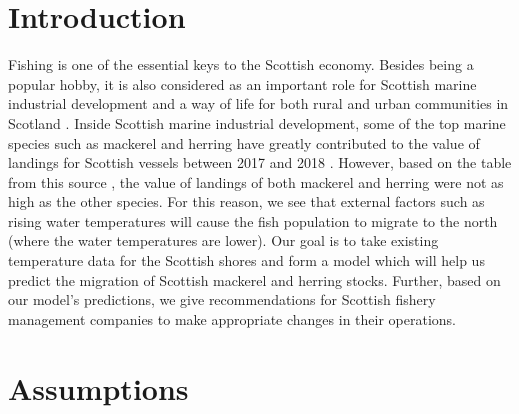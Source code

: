 \documentclass[12pt]{article}
\begin{document}

\newpage
\tableofcontents
\newpage

\section{Introduction}
Fishing is one of the essential keys to the Scottish economy. Besides being a popular hobby, it is also considered as an important role for Scottish marine industrial development and a way of life for both rural and urban communities in Scotland \cite{marine_economy}. Inside Scottish marine industrial development, some of the top marine species such as mackerel and herring have greatly contributed to the value of landings for Scottish vessels between 2017 and 2018 \cite{scot_fishery}. However, based on the table from this source \cite{scot_fishery}, the value of landings of both mackerel and herring were not as high as the other species. For this reason, we see that external factors such as rising water temperatures will cause the fish population to migrate to the north (where the water temperatures are lower). Our goal is to take existing temperature data for the Scottish shores and form a model which will help us predict the migration of Scottish mackerel and herring stocks. Further, based on our model's predictions, we give recommendations for Scottish fishery management companies to make appropriate changes in their operations.

\section{Assumptions}
\end{document}
